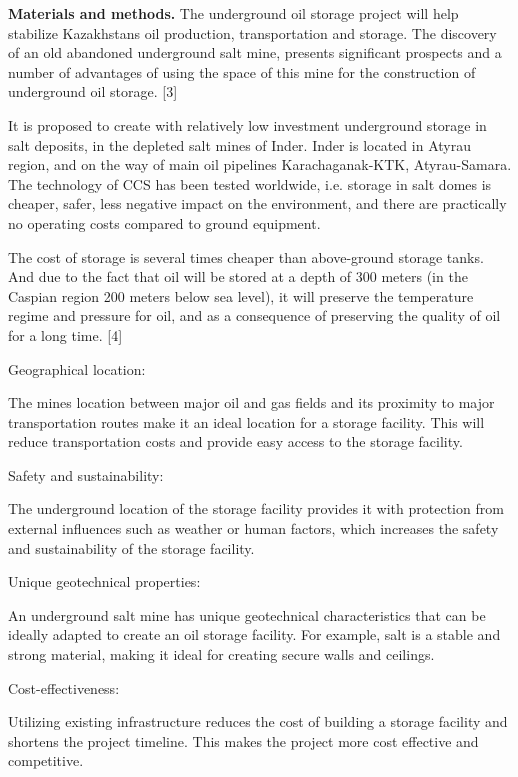 \begin{multicols}{2}
{\bfseries Materials and methods.} The underground oil storage project will
help stabilize Kazakhstan\textquotesingle s oil production,
transportation and storage. The discovery of an old abandoned
underground salt mine, presents significant prospects and a number of
advantages of using the space of this mine for the construction of
underground oil storage. {[}3{]}

It is proposed to create with relatively low investment underground
storage in salt deposits, in the depleted salt mines of Inder. Inder is
located in Atyrau region, and on the way of main oil pipelines
Karachaganak-KTK, Atyrau-Samara. The technology of CCS has been tested
worldwide, i.e. storage in salt domes is cheaper, safer, less negative
impact on the environment, and there are practically no operating costs
compared to ground equipment.

The cost of storage is several times cheaper than above-ground storage
tanks. And due to the fact that oil will be stored at a depth of 300
meters (in the Caspian region 200 meters below sea level), it will
preserve the temperature regime and pressure for oil, and as a
consequence of preserving the quality of oil for a long time. {[}4{]}

Geographical location:

The mine\textquotesingle s location between major oil and gas fields and
its proximity to major transportation routes make it an ideal location
for a storage facility. This will reduce transportation costs and
provide easy access to the storage facility.

Safety and sustainability:

The underground location of the storage facility provides it with
protection from external influences such as weather or human factors,
which increases the safety and sustainability of the storage facility.

Unique geotechnical properties:

An underground salt mine has unique geotechnical characteristics that
can be ideally adapted to create an oil storage facility. For example,
salt is a stable and strong material, making it ideal for creating
secure walls and ceilings.

Cost-effectiveness:

Utilizing existing infrastructure reduces the cost of building a storage
facility and shortens the project timeline. This makes the project more
cost effective and competitive.


\end{multicols}
